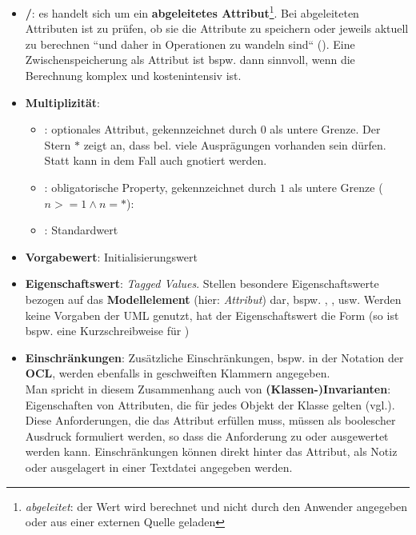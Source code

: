 \begin{itemize}
\begin{itemize}
        \item \textbf{/}: es handelt sich um ein \textbf{abgeleitetes Attribut}\footnote{
            \textit{abgeleitet}: der Wert wird berechnet und nicht durch den Anwender angegeben oder aus einer externen Quelle geladen
        }. Bei abgeleiteten Attributen ist zu prüfen, ob sie  die Attribute zu speichern oder jeweils aktuell zu berechnen ``und daher in Operationen zu wandeln sind`` (\cite[414]{Bal05}). Eine Zwischenspeicherung als Attribut ist bspw. dann sinnvoll, wenn die Berechnung komplex und kostenintensiv ist.
        \item \textbf{Multiplizität}:
        \begin{itemize}
            \item \code{[0..*]}: optionales Attribut, gekennzeichnet durch $0$ als untere Grenze.
            Der Stern $*$ zeigt an, dass bel. viele Ausprägungen vorhanden sein dürfen.
            Statt \code{[0..*]} kann in dem Fall auch \code{[*]} gnotiert werden.
            \item \code{[1..n]}: obligatorische Property, gekennzeichnet durch $1$ als untere Grenze ($n >= 1 \land n=*$):
            \item \code{[1]}: Standardwert
        \end{itemize}
        \item \textbf{Vorgabewert}: Initialisierungswert
        \item \textbf{Eigenschaftswert}: \textit{Tagged Values}.
        Stellen besondere Eigenschaftswerte bezogen auf das \textbf{Modellelement} (hier: \textit{Attribut}) dar, {bspw.} , ,  usw. Werden keine Vorgaben der UML genutzt, hat der Eigenschaftswert die Form  (so ist bspw.  eine Kurzschreibweise für  )
        \item \textbf{Einschränkungen}: Zusätzliche Einschränkungen, bspw. in der Notation der \textbf{OCL}, werden ebenfalls in geschweiften Klammern angegeben.\\
        Man spricht in diesem Zusammenhang auch von \textbf{(Klassen-)Invarianten}: Eigenschaften von Attributen, die für jedes Objekt der Klasse gelten (vgl.\cite[338]{Oes05}).
        Diese Anforderungen, die das Attribut erfüllen muss, müssen als boolescher Ausdruck formuliert werden, so dass die Anforderung zu  oder  ausgewertet werden kann.
        Einschränkungen können direkt hinter das Attribut, als Notiz oder ausgelagert in einer Textdatei angegeben werden.
    \end{itemize}

\end{itemize}

